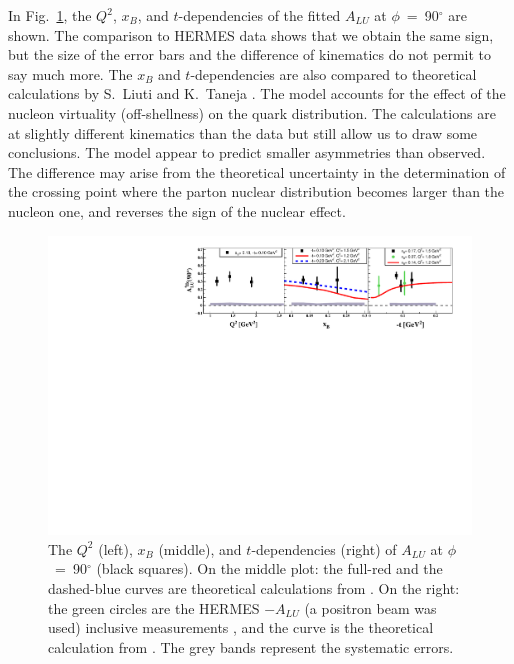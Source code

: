 \documentclass[twocolumn,nofootinbib,showpacs,prl,superscriptaddress,secnumarabic,amssymb,nobibnotes,aps,floatfix]{revtex4}
\begin{document}
In Fig.~\ref{fig:alu90}, the $Q^2$, $x_{B}$, and $t$-dependencies of the fitted 
$A_{LU}$ at $\phi$~=~90$^{\circ}$ are shown. The comparison to HERMES data
shows that we obtain the same sign, but the size of the error bars and the difference
of kinematics do not permit to say much more. The $x_{B}$ and $t$-dependencies 
are also compared to theoretical calculations by S.~Liuti and K.~Taneja 
\cite{simonetta_2}. The model accounts for the effect of the nucleon virtuality 
(off-shellness) on the quark distribution. The calculations are at slightly 
different kinematics than the data but still allow us to draw some conclusions. The 
model appear to predict smaller asymmetries than observed. 
The difference may arise from the theoretical uncertainty in the determination 
of the crossing point where the parton nuclear distribution becomes larger than the 
nucleon one, and reverses the sign of the nuclear effect.

\begin{figure}[tb]
\includegraphics[width=16cm]{F_Coherent_ALU_phi_90.pdf}
\caption{The $Q^{2}$ (left), $x_{B}$ (middle), and $t$-dependencies (right) of
   $A_{LU}$ at $\phi$~=~90$^{\circ}$ (black squares). On the 
   middle plot: the full-red and the dashed-blue curves are theoretical 
   calculations from \cite{simonetta_2}. On the right: the green circles are 
   the HERMES $-A_{LU}$ (a positron beam was used) inclusive measurements 
   \cite{Airapetian:2010nu}, and the curve is the theoretical calculation 
   from \cite{simonetta_2}. The grey bands represent the systematic errors.}
\label{fig:alu90}
\end{figure}
\end{document}
